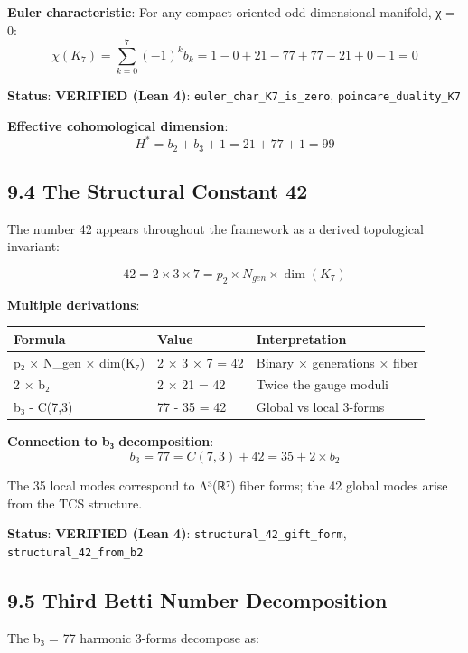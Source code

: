 \documentclass[11pt,a4paper]{article}
\begin{document}
\textbf{Euler characteristic}: For any compact oriented odd-dimensional manifold, χ = 0: \[\chi(K_7) = \sum_{k=0}^{7} (-1)^k b_k = 1 - 0 + 21 - 77 + 77 - 21 + 0 - 1 = 0\]

\textbf{Status}: \textbf{VERIFIED (Lean 4)}: \texttt{euler\_\allowbreak{}char\_\allowbreak{}K7\_\allowbreak{}is\_\allowbreak{}zero}, \texttt{poincare\_\allowbreak{}duality\_\allowbreak{}K7}

\textbf{Effective cohomological dimension}: \[H^* = b_2 + b_3 + 1 = 21 + 77 + 1 = 99\]

\subsection{9.4 The Structural Constant 42}\label{the-structural-constant-42}

The number 42 appears throughout the framework as a derived topological invariant:

\[42 = 2 \times 3 \times 7 = p_2 \times N_{gen} \times \dim(K_7)\]

\textbf{Multiple derivations}:

\begin{longtable}[]{@{}lll@{}}
\toprule\noalign{}
Formula & Value & Interpretation \\
\midrule\noalign{}
\endhead
\bottomrule\noalign{}
\endlastfoot
p₂ × N\_\allowbreak{}gen × dim(K₇) & 2 × 3 × 7 = 42 & Binary × generations × fiber \\
2 × b₂ & 2 × 21 = 42 & Twice the gauge moduli \\
b₃ - C(7,3) & 77 - 35 = 42 & Global vs local 3-forms \\
\end{longtable}

\textbf{Connection to b₃ decomposition}: \[b_3 = 77 = C(7,3) + 42 = 35 + 2 \times b_2\]

The 35 local modes correspond to Λ³(ℝ⁷) fiber forms; the 42 global modes arise from the TCS structure.

\textbf{Status}: \textbf{VERIFIED (Lean 4)}: \texttt{structural\_\allowbreak{}42\_\allowbreak{}gift\_\allowbreak{}form}, \texttt{structural\_\allowbreak{}42\_\allowbreak{}from\_\allowbreak{}b2}

\subsection{9.5 Third Betti Number Decomposition}\label{third-betti-number-decomposition}

The b₃ = 77 harmonic 3-forms decompose as:
\end{document}
